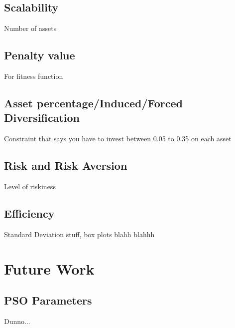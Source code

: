 \documentclass{pdfmx4020}
\begin{document}


  \section{Scalability} %
  \label{sec:scalability}
    Number of assets

  \section{Penalty value} %
  \label{sec:penalty_value}
    For fitness function

  \section{Asset percentage/Induced/Forced Diversification} %
  \label{sec:asset_percentage}
    Constraint that says you have to invest between 0.05 to 0.35 on each asset

  \section{Risk and Risk Aversion} %
  \label{sec:risk_and_risk_aversion}
    Level of riskiness

  \section{Efficiency} %
  \label{sec:efficiency}
    Standard Deviation stuff, box plots blahh blahhh


\chapter{Future Work}

  \section{PSO Parameters} %
  \label{sec:parameters}
    Dunno...
\end{document}
